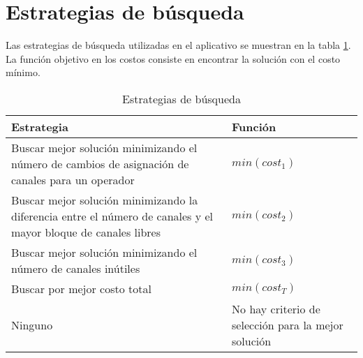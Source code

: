 \section{Estrategias de búsqueda} \label{sec:esbusq}

Las estrategias de búsqueda utilizadas en el aplicativo se muestran en la tabla \ref{table:esBusqueda}. La función objetivo en los costos consiste en encontrar la solución con el costo mínimo.

\begin{center}
\begin{longtable}{|p{9.5cm}|p{7cm}|}
	\caption{Estrategias de búsqueda} \label{table:esBusqueda}\\
	\hline
	\cellcolor[gray]{0.9} \textbf{Estrategia} & \cellcolor[gray]{0.9}\textbf{Función} \\
	\hline
	Buscar mejor solución minimizando el número de cambios de asignación de canales para un operador & $min(cost_{1})$\\
	\hline
	Buscar mejor solución minimizando la diferencia entre el número de canales y el mayor bloque de canales libres &  $min(cost_{2})$\\
	\hline
	Buscar mejor solución minimizando el número de canales inútiles&  $min(cost_{3})$\\
	\hline
	Buscar por mejor costo total &  $min(cost_{T})$\\
	\hline
	Ninguno & No hay criterio de selección para la mejor solución \\
	\hline
\end{longtable}	
\end{center}

